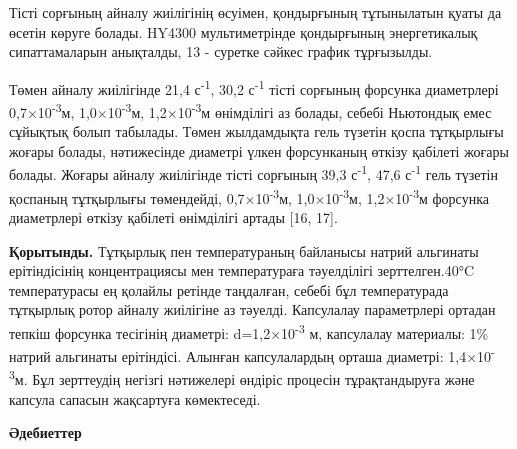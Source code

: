 \begin{multicols}{2}
Тісті сорғының айналу жиілігінің өсуімен, қондырғының тұтынылатын қуаты
да өсетін көруге болады. HY4300 мультиметрінде қондырғының энергетикалық
сипаттамаларын анықталды, 13 - суретке сәйкес график тұрғызылды.

Төмен айналу жиілігінде 21,4 с\textsuperscript{-1}, 30,2
с\textsuperscript{-1} тісті сорғының форсунка диаметрлері
0,7×10\textsuperscript{-3}м, 1,0×10\textsuperscript{-3}м,
1,2×10\textsuperscript{-3}м өнімділігі аз болады, себебі Ньютондық емес
сұйықтық болып табылады. Төмен жылдамдықта гель түзетін қоспа тұтқырлығы
жоғары болады, нәтижесінде диаметрі үлкен форсунканың өткізу қабілеті
жоғары болады. Жоғары айналу жиілігінде тісті сорғының 39,3
с\textsuperscript{-1}, 47,6 с\textsuperscript{-1} гель түзетін қоспаның
тұтқырлығы төмендейді, 0,7×10\textsuperscript{-3}м,
1,0×10\textsuperscript{-3}м, 1,2×10\textsuperscript{-3}м форсунка
диаметрлері өткізу қабілеті өнімділігі артады {[}16, 17{]}.

{\bfseries Қорытынды.} Тұтқырлық пен температураның байланысы натрий
альгинаты ерітіндісінің концентрациясы мен температураға тәуелділігі
зерттелген.40°C температурасы ең қолайлы ретінде таңдалған, себебі бұл
температурада тұтқырлық ротор айналу жиілігіне аз тәуелді. Капсулалау
параметрлері ортадан тепкіш форсунка тесігінің диаметрі:
d=1,2×10\textsuperscript{-3} м, капсулалау материалы: 1\% натрий
альгинаты ерітіндісі. Алынған капсулалардың орташа диаметрі:
1,4×10\textsuperscript{-3}м. Бұл зерттеудің негізгі нәтижелері өндіріс
процесін тұрақтандыруға және капсула сапасын жақсартуға көмектеседі.
\end{multicols}

\begin{center}
{\bfseries Әдебиеттер}
\end{center}

